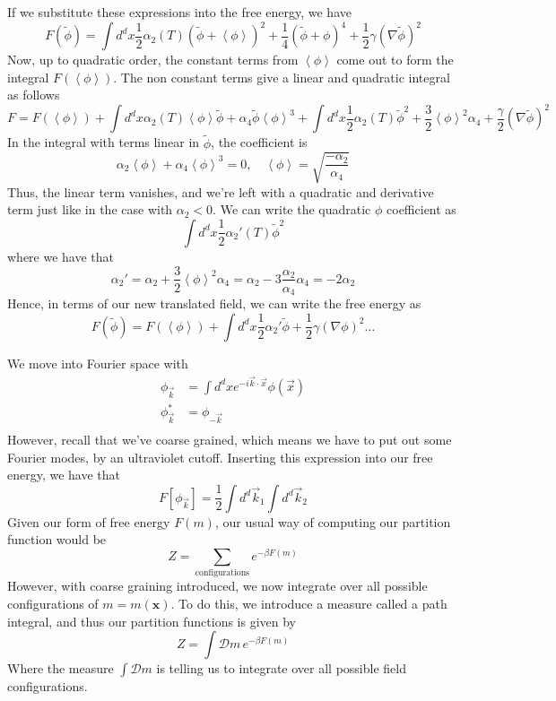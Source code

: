 If we substitute these expressions into the free energy, we have
\[
	F( \widetilde{\phi}) = \int d^{d }x \frac{1}{ 2} \alpha_2 ( T ) ( \widetilde { \phi} + \left<\phi \right> )^ 2 + \frac{1}{4} ( \widetilde{ \phi} + \phi)^ 4 + \frac{1}{2 } \gamma ( \nabla  \widetilde{\phi} ) ^2 
\] Now, up to quadratic order, the constant terms from $ \left< \phi \right> $ 
come out to form the integral $ F ( \left< \phi \right> ) $. The non constant terms 
give a linear and quadratic integral as follows 
\[
	F = F( \left< \phi \right>) + \int d^{d } x \alpha_2 ( T ) \left< \phi \right>\widetilde{ \phi} + \alpha_4 \widetilde{ \phi } \left< \phi \right>^3 +\int d^{d } x \frac{1}{2} \alpha_2 ( T ) \widetilde { \phi }^2 + \frac{3}{2 } \left< \phi \right>^2 \alpha_4 + \frac{\gamma}{2 } ( \nabla \widetilde{ \phi }  )^2 
\] 
In the integral with terms linear in $ \widetilde{ \phi } $, the coefficient is 
 \[
\alpha_2 \left< \phi \right> + \alpha_4 \left< \phi  \right>^3 = 0, \quad \left< \phi \right> = \sqrt{ \frac{ - \alpha_2 }{\alpha_4}} 
\] Thus, the linear term vanishes, and we're left with a quadratic and derivative term
just like in the case with $ \alpha_2 < 0 $.
We can write the quadratic $ \phi $ coefficient as 
\[
	\int d^{d }x \frac{1}{ 2 } \alpha_2' ( T) \widetilde{ \phi }^2 
\]  where we have that 
\[
\alpha_2'  = \alpha_2 + \frac{3}{2} \left< \phi  \right>^2\alpha_4 = \alpha_2  - 3 \frac{\alpha_2 }{\alpha_4} \alpha_4  = - 2 \alpha_2 
\] 
Hence, in terms of our new translated field, we can write the free energy as 
\[
	F (\widetilde{ \phi } ) = F( \left< \phi \right>) + \int d ^{d }x \frac{1}{ 2} \alpha_2' \widetilde{ \phi } + \frac{1}{2 }\gamma ( \nabla \phi)^2 \dots 
\] 

We move into Fourier space with 
\begin{align*}
	\phi_{\vec{k}}  &= \int d^{d}x e^{ - i \vec{k} \cdot  \vec{x}} \phi( \vec{x}) \\
	\phi_{ \vec{k}}^*  &= \phi_{-\vec{k}}  \\
\end{align*}
However, recall that we've coarse grained, which means 
we have to put out some Fourier modes, by an ultraviolet cutoff. 
Inserting this expression into our free energy, we have that 
\[
	F [ \phi_{ \vec{k}} ] = \frac{1}{2}\int d^{d} \vec{k}_1 \int d^{ d}\vec{k}_2 
\] 
Given our form of free energy $F(m)$, our usual way of computing our partition function would be \[ Z = \sum_{\text{configurations}} e^{ - \beta F(m) } \] However, with coarse graining introduced, we now integrate over all possible configurations of $m = m(\mathbf{ x} )$. To do this, we introduce a measure called a path integral, and thus our partition functions is given by \[ Z = \int \mathcal{D} m \, e^{ - \beta F(m)} \]
Where the measure $\int \mathcal{ D } m $ is telling us to integrate over all possible field configurations. 

